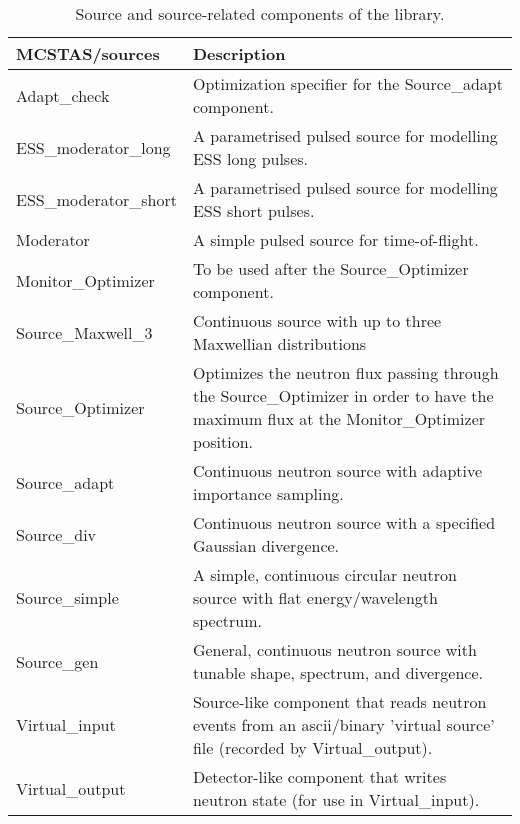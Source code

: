\begin{table}
  \begin{center}
    {\let\my=\\
    \begin{tabular}{|p{}|p{}|}
      \hline
       \textbf{MCSTAS/sources} & Description \\
       \hline
Adapt\_check & Optimization specifier for the Source\_adapt component. \\
ESS\_moderator\_long & A parametrised pulsed source for modelling ESS long pulses. \\
ESS\_moderator\_short & A parametrised pulsed source for modelling ESS short pulses. \\
Moderator  & A simple pulsed source for time-of-flight. \\
Monitor\_Optimizer &  To be used after the Source\_Optimizer component. \\
Source\_Maxwell\_3 & Continuous source with up to three Maxwellian distributions \\
Source\_Optimizer & Optimizes the neutron flux passing through the Source\_Optimizer in order to have the maximum flux at the Monitor\_Optimizer position. \\
Source\_adapt  &       Continuous neutron source with adaptive importance sampling. \\
Source\_div &          Continuous neutron source with a specified Gaussian divergence. \\
Source\_simple &  A simple, continuous circular neutron source with flat energy/wavelength spectrum.\\
Source\_gen     &    General, continuous neutron source with tunable shape, spectrum,
                     and divergence. \\
Virtual\_input &  Source-like component that reads neutron events
                  from an ascii/binary 'virtual source' file (recorded by Virtual\_output). \\
Virtual\_output &  Detector-like component that writes neutron state
                   (for use in Virtual\_input). \\
      \hline
    \end{tabular}
    \caption{Source and source-related components of the \MCS library.}
    \label{t:comp-sources}
    }
  \end{center}
\end{table}


